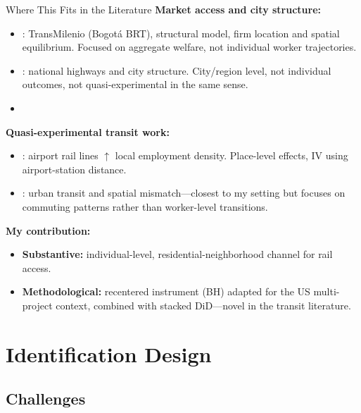 \documentclass{beamer}
\begin{document}
\begin{frame}{Where This Fits in the Literature}
\small
\textbf{Market access and city structure:}
\begin{itemize}
    \item \textcite{tsivanidis_evaluating_2022}: TransMilenio (Bogotá BRT), structural model,
          firm location and spatial equilibrium. Focused on aggregate welfare, not individual
          worker trajectories.
    \item \textcite{baum-snow_does_2020}: national highways and city structure. City/region
          level, not individual outcomes, not quasi-experimental in the same sense.
    \item %
\end{itemize}

\medskip
\textbf{Quasi-experimental transit work:}
\begin{itemize}
    \item \textcite{tyndall_airports}: airport rail lines $\uparrow$ local employment density.
          Place-level effects, IV using airport-station distance.
    \item \textcite{perez_urban_2022}: urban transit and spatial mismatch---closest to my setting
          but focuses on commuting patterns rather than worker-level transitions.
\end{itemize}

\medskip
\textbf{My contribution:}
\begin{itemize}
    \item \textbf{Substantive:} individual-level, residential-neighborhood channel for rail access.
    \item \textbf{Methodological:} recentered instrument (BH) adapted for the US multi-project
          context, combined with stacked DiD---novel in the transit literature.
\end{itemize}
\end{frame}

\section{Identification Design}

\subsection{Challenges}
\end{document}
